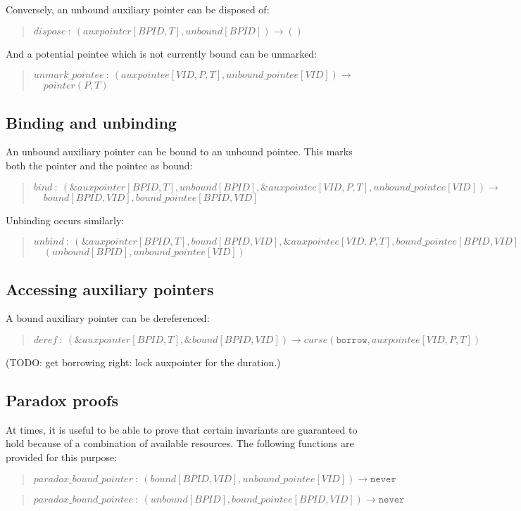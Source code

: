 \documentclass[a4paper]{book}
\newcommand\FuncSignature[2]{\begin{quote}$\mathit{#1}\ :\ \mathit{#2}$\end{quote}}
\newcommand\FuncSignatureII[3]{\begin{quote}$\mathit{#1}\ :\ \mathit{#2} \to$\\${}\quad \mathit{#3}$ \end{quote}}
\begin{document}
\noindent
Conversely, an unbound auxiliary pointer can be disposed of:
\FuncSignature{dispose}{(auxpointer[BPID,T], unbound[BPID]) \to ()}

\noindent
And a potential pointee which is not currently bound can be unmarked:
\FuncSignatureII{unmark\_pointee}
{(auxpointee[VID,P,T], unbound\_pointee[VID])
}
{pointer(P,T)}

\subsection*{Binding and unbinding}
An unbound auxiliary pointer can be bound to an unbound pointee.
This marks both the pointer and the pointee as bound:

\FuncSignatureII{bind}
{(\&auxpointer[BPID,T], unbound[BPID], \&auxpointee[VID,P,T], unbound\_pointee[VID])}
{bound[BPID,VID], bound\_pointee[BPID,VID]}

\noindent
Unbinding occurs similarly:
\FuncSignatureII{unbind}
{(\&auxpointer[BPID,T], bound[BPID,VID], \&auxpointee[VID,P,T], bound\_pointee[BPID,VID])}
{(unbound[BPID], unbound\_pointee[VID])}

\subsection*{Accessing auxiliary pointers}

A bound auxiliary pointer can be dereferenced:

\FuncSignature{deref}{
  (\&auxpointer[BPID,T], \&bound[BPID,VID])
  \to
  curse(\mathtt{borrow}, auxpointee[VID,P,T])}

(TODO: get borrowing right: lock auxpointer for the duration.)



\subsection*{Paradox proofs}

At times, it is useful to be able to prove that certain invariants are
guaranteed to hold because of a combination of available resources.
The following functions are provided for this purpose:

\FuncSignature{paradox\_bound\_pointer}{
  (bound[BPID,VID], unbound\_pointee[VID]) \to \mathtt{never}}
\FuncSignature{paradox\_bound\_pointee}{
  (unbound[BPID], bound\_pointee[BPID,VID]) \to \mathtt{never}}
\end{document}
